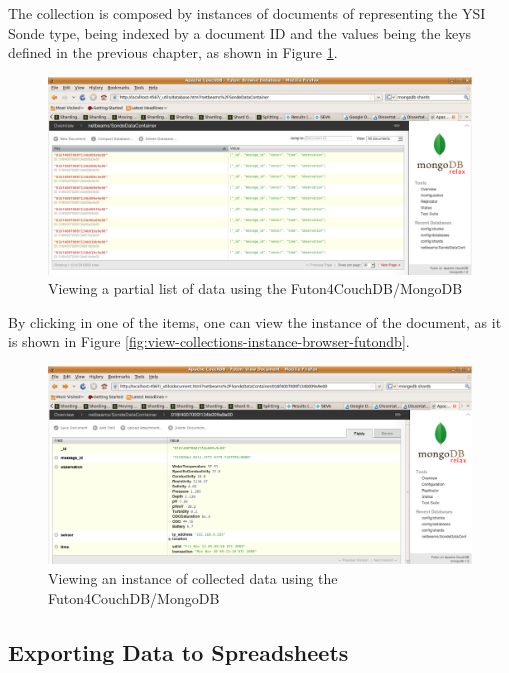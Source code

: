 The collection is composed by instances of documents of representing the YSI
Sonde type, being indexed by a document ID and the values being the keys
defined in the previous chapter, as shown in Figure
\ref{fig:view-collected-data-list-browser-futondb}.

\begin{figure}[h]
  \centering
 
  \includegraphics[scale=0.5]{../diagrams/view-collected-data-list-browser-futondb}
  \caption{Viewing a partial list of data using the Futon4CouchDB/MongoDB}
  \label{fig:view-collected-data-list-browser-futondb}
\end{figure}

By clicking in one of the items, one can view the instance of the document, as
it is shown in Figure \ref{fig:view-collections-instance-browser-futondb}.

\begin{figure}[h]
  \centering
  \includegraphics[scale=0.5]{../diagrams/view-collected-data-instance-browser-futondb} 
  \caption{Viewing an instance of collected data using the Futon4CouchDB/MongoDB}
  \label{fig:view-collected-data-instance-browser-futondb}
\end{figure}

\subsection{Exporting Data to Spreadsheets}

